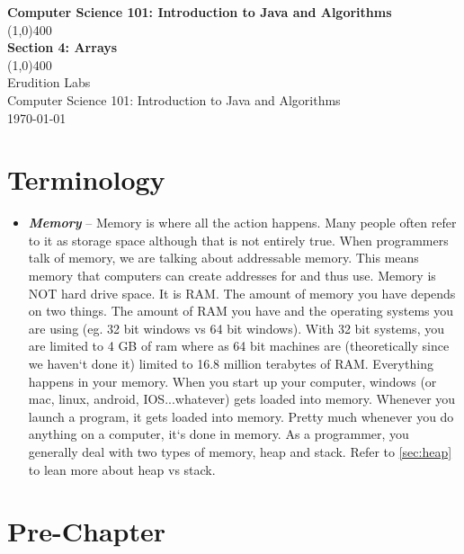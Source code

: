 \documentclass[11]{article}
\begin{document}
\begin{titlepage}
\begin{center}
\vspace{1cm}
\Large{\textbf{Computer Science 101: Introduction to Java and Algorithms}}\\
\vfill
\line(1,0){400}\\
\huge{\textbf{Section 4: Arrays}}\\
\line(1,0){400}\\
\vfill
Erudition Labs\\
Computer Science 101: Introduction to Java and Algorithms\\
\today\\
\end{center}
\end{titlepage}

\tableofcontents
\thispagestyle{empty}
\clearpage
\setcounter{page}{1}

\section{Terminology}
\begin{itemize}
  \item \textbf{\textit{Memory}} --
  Memory is where all the action happens. Many people often refer to it as storage space although that is not entirely true. When programmers talk of memory, we are talking about addressable memory. This means memory that computers can create addresses for and thus use. Memory is NOT hard drive space. It is RAM. The amount of memory you have depends on two things. The amount of RAM you have and the operating systems you are using (eg. 32 bit windows vs 64 bit windows). With 32 bit systems, you are limited to 4 GB of ram where as 64 bit machines are (theoretically since we haven`t done it) limited to 16.8 million terabytes of RAM. Everything happens in your memory. When you start up your computer, windows (or mac, linux, android, IOS...whatever) gets loaded into memory. Whenever you launch a program, it gets loaded into memory. Pretty much whenever you do anything on a computer, it`s done in memory. As a programmer, you generally deal with two types of memory, heap and stack. Refer to \autoref{sec:heap} to lean more about heap vs stack.

  

\end{itemize}
\section{Pre-Chapter}
\end{document}
